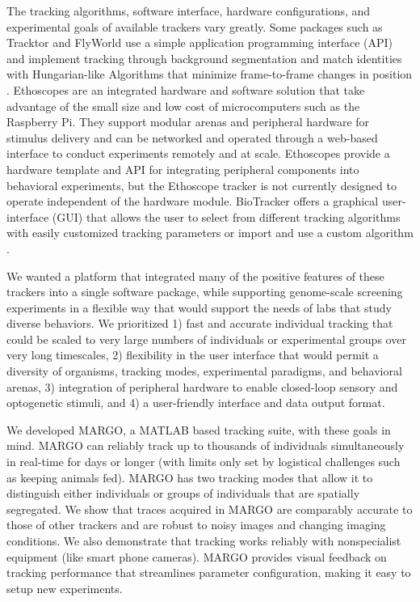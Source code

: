 \documentclass[12pt,letterpaper]{article}
\begin{document}
The tracking algorithms, software interface, hardware configurations, and experimental goals of available trackers vary greatly. Some packages such as Tracktor and FlyWorld use a simple application programming interface (API) and implement tracking through background segmentation and match identities with Hungarian-like Algorithms that minimize frame-to-frame changes in position \cite{Kuhn_The_1955,Rodriguez_ToxId_2017,Liu_A_2018}. Ethoscopes are an integrated hardware and software solution that take advantage of the small size and low cost of microcomputers such as the Raspberry Pi. They support modular arenas and peripheral hardware for stimulus delivery \cite{Geissmann_Ethoscopes_2017} and can be networked and operated through a web-based interface to conduct experiments remotely and at scale. Ethoscopes provide a hardware template and API for integrating peripheral components into behavioral experiments, but the Ethoscope tracker is not currently designed to operate independent of the hardware module. BioTracker offers a graphical user-interface (GUI) that allows the user to select from different tracking algorithms with easily customized tracking parameters or import and use a custom algorithm \cite{Mnck_BioTracker_2018}. 

We wanted a platform that integrated many of the positive features of these trackers into a single software package, while supporting genome-scale screening experiments in a flexible way that would support the needs of labs that study diverse behaviors. We prioritized 1) fast and accurate individual tracking that could be scaled to very large numbers of individuals or experimental groups over very long timescales, 2) flexibility in the user interface that would permit a diversity of organisms, tracking modes, experimental paradigms, and behavioral arenas, 3) integration of peripheral hardware to enable closed-loop sensory and optogenetic stimuli, and 4) a user-friendly interface and data output format. 

We developed MARGO, a MATLAB based tracking suite, with these goals in mind. MARGO can reliably track up to thousands of individuals simultaneously in real-time for days or longer (with limits only set by logistical challenges such as keeping animals fed). MARGO has two tracking modes that allow it to distinguish either individuals or groups of individuals that are spatially segregated. We show that traces acquired in MARGO are comparably accurate to those of other trackers and are robust to noisy images and changing imaging conditions. We also demonstrate that tracking works reliably with nonspecialist equipment (like smart phone cameras). MARGO provides visual feedback on tracking performance that streamlines parameter configuration, making it easy to setup new experiments. 
\end{document}
